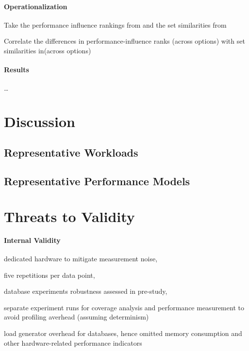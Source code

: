 
{\color{blue}
	\paragraph{Operationalization} 
	
	\begin{compactitem}
		\item Take the performance influence rankings from  and the set similarities from  
		\item Correlate the differences in performance-influence ranks (across options) with set similarities in(across options) 
	\end{compactitem}
	 
	\paragraph{Results} \ldots
}


\section{Discussion}
\subsection{Representative Workloads}
\subsection{Representative Performance Models}
\clearpage

\section{Threats to Validity}\label{sec:threats}
\paragraph{Internal Validity}\label{sec:internal_validity}

\begin{compactitem}
	\item dedicated hardware to mitigate measurement noise, 
	\item five repetitions per data point, 
	\item database experiments robustness assessed in pre-study,
	\item separate experiment runs for coverage analysis and performance measurement to avoid profiling averhead (assuming determinism)
	\item load generator overhead for databases, hence omitted memory consumption and other hardware-related performance indicators 
\end{compactitem}

